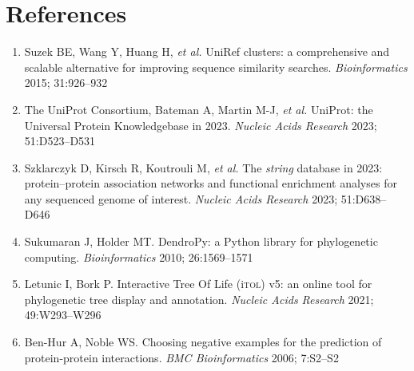 \section*{References}
\begin{enumerate}
    \item  Suzek BE, Wang Y, Huang H, \textit{et al.} UniRef clusters: a comprehensive and scalable alternative for improving sequence similarity searches. \textit{Bioinformatics} 2015; 31:926–932
    
    \item The UniProt Consortium, Bateman A, Martin M-J, \textit{et al.} UniProt: the Universal Protein Knowledgebase in 2023. \textit{Nucleic Acids Research} 2023; 51:D523–D531

    \item Szklarczyk D, Kirsch R, Koutrouli M, \textit{et al.} The \textit{string} database in 2023: protein–protein association networks and functional enrichment analyses for any sequenced genome of interest. \textit{Nucleic Acids Research} 2023; 51:D638–D646

    \item Sukumaran J, Holder MT. DendroPy: a Python library for phylogenetic computing. \textit{Bioinformatics} 2010; 26:1569–1571

    \item Letunic I, Bork P. Interactive Tree Of Life (i\textsc{tol}) v5: an online tool for phylogenetic tree display and annotation. \textit{Nucleic Acids Research} 2021; 49:W293–W296

    \item Ben-Hur A, Noble WS. Choosing negative examples for the prediction of protein-protein interactions. \textit{BMC Bioinformatics} 2006; 7:S2–S2
\end{enumerate}
